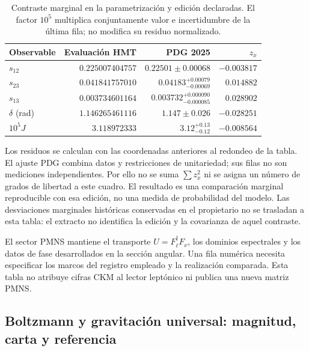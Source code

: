 \begin{table}[htbp]
\centering\small
\setlength{\tabcolsep}{4pt}
\begin{tabular}{@{}lrrr@{}}
\toprule
Observable & Evaluación HMT & PDG 2025 & \(z_x\)\\
\midrule
\(s_{12}\) & \(0.225007404757\) & \(0.22501\pm0.00068\) & \(-0.003817\)\\
\(s_{23}\) & \(0.041841757010\) & \(0.04183^{+0.00079}_{-0.00069}\) & \(0.014882\)\\
\(s_{13}\) & \(0.003734601164\) & \(0.003732^{+0.000090}_{-0.000085}\) & \(0.028902\)\\
\(\delta\) (rad) & \(1.146265461116\) & \(1.147\pm0.026\) & \(-0.028251\)\\
\(10^5J\) & \(3.118972333\) & \(3.12^{+0.13}_{-0.12}\) & \(-0.008564\)\\
\bottomrule
\end{tabular}
\caption{Contraste marginal en la parametrización y edición declaradas.
El factor \(10^5\) multiplica conjuntamente valor e incertidumbre de la
última fila; no modifica su residuo normalizado.}
\label{tab:ii-ckm-comparacion}
\end{table}

Los residuos se calculan con las coordenadas anteriores al redondeo
de la tabla. El ajuste PDG combina datos y restricciones de unitariedad;
sus filas no son mediciones independientes. Por ello no se suma
\(\sum z_x^2\) ni se asigna un número de grados de libertad a este cuadro.
El resultado es una comparación marginal reproducible con esa edición,
no una medida de probabilidad del modelo. Las desviaciones marginales
históricas conservadas en el propietario no se trasladan a esta tabla:
el extracto no identifica la edición y la covarianza de aquel contraste.

El sector PMNS mantiene el transporte \(U=F_\ell^\dagger F_\nu\), los
dominios espectrales y los datos de fase desarrollados en la sección
angular. Una fila numérica necesita especificar los marcos del registro
empleado y la realización comparada. Esta tabla no atribuye cifras CKM
al lector leptónico ni publica una nueva matriz PMNS.

\subsection{Boltzmann y gravitación universal: magnitud, carta y referencia}

